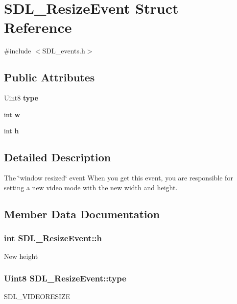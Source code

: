 \section{S\+D\+L\+\_\+\+Resize\+Event Struct Reference}
\label{struct_s_d_l___resize_event}


{\ttfamily \#include $<$S\+D\+L\+\_\+events.\+h$>$}

\subsection*{Public Attributes}
\begin{DoxyCompactItemize}
\item 
Uint8 {\bf type}
\item 
int {\bf w}
\item 
int {\bf h}
\end{DoxyCompactItemize}


\subsection{Detailed Description}
The \char`\"{}window resized\char`\"{} event When you get this event, you are responsible for setting a new video mode with the new width and height. 

\subsection{Member Data Documentation}
\subsubsection[{h}]{\setlength{\rightskip}{0pt plus 5cm}int S\+D\+L\+\_\+\+Resize\+Event\+::h}\label{struct_s_d_l___resize_event_a323addc213067775cccb1c1032aebf8b}
New height 
\subsubsection[{type}]{\setlength{\rightskip}{0pt plus 5cm}Uint8 S\+D\+L\+\_\+\+Resize\+Event\+::type}\label{struct_s_d_l___resize_event_a0f35cba640e999f4dd77e4267b812525}
S\+D\+L\+\_\+\+V\+I\+D\+E\+O\+R\+E\+S\+I\+Z\+E 
